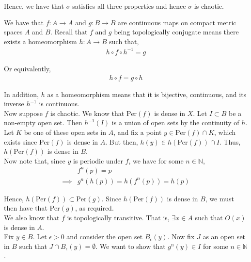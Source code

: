 \documentclass[12pt]{article}
\newenvironment{problem}[2][Problem]{\begin{trivlist}
\item[\hskip \labelsep {\bfseries #1}\hskip \labelsep {\bfseries #2.}]}{\end{trivlist}}
\begin{document}
Hence, we have that $\sigma$ satisfies all three properties and hence $\sigma$ is chaotic.

\begin{problem}{2}
\end{problem}

We have that $f: A \to A$ and $g: B \to B$ are continuous maps on compact metric spaces $A$ and $B$. Recall that $f$ and $g$ being topologically conjugate means there exists a homeomorphism $h: A \to B$ such that,
\begin{align*}
h \circ f \circ h^{-1} = g
\end{align*}

Or equivalently,
\begin{align*}
h \circ f = g \circ h
\end{align*}

In addition, $h$ as a homeomorphism means that it is bijective, continuous, and its inverse $h^{-1}$ is continuous.\\

Now suppose $f$ is chaotic. We know that $\text{Per}(f)$ is dense in $X$. Let $I \subset B$ be a non-empty open set. Then $h^{-1}(I)$ is a union of open sets by the continuity of $h$. Let $K$ be one of these open sets in $A$, and fix a point $y \in \text{Per}(f) \cap K$, which exists since $\text{Per}(f)$ is dense in $A$. But then, $h(y) \in h(\text{Per}(f)) \cap I$. Thus, $h(\text{Per}(f))$ is dense in $B$.\\

Now note that, since $y$ is periodic under $f$, we have for some $n \in \mathbb{N}$,
\begin{align*}
&f^n(p) = p\\
\implies &g^n(h(p)) = h(f^n(p)) = h(p)
\end{align*}

Hence, $h(\text{Per}(f)) \subset \text{Per}(g)$. Since $h(\text{Per}(f))$ is dense in $B$, we must then have that $\text{Per}(g)$, as required.\\

We also know that $f$ is topologically transitive. That is, $\exists x \in A$ such that $O(x)$ is dense in $A$.\\

Fix $y \in B$. Let $\epsilon > 0$ and consider the open set $B_{\epsilon}(y)$. Now fix $J$ as an open set in $B$ such that $J \cap B_{\epsilon}(y) = \emptyset$. We want to show that $g^n(y) \in I$ for some $n \in \mathbb{N}$.\\
\end{document}
